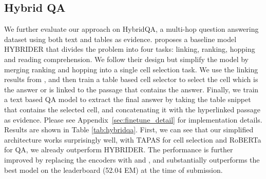 \documentclass[11pt]{article}
\newcommand{\revise}[1]{#1}
\newcommand{\nop}[1]{}
\newcommand{\ours}[0]{\text{ReasonBERT}}
\begin{document}
\subsection{Hybrid QA}
We further evaluate our approach on HybridQA, a multi-hop question answering dataset using both text and tables as evidence. \citet{chen-etal-2020-hybridqa} proposes a baseline model HYBRIDER that divides the problem into four tasks: linking, ranking, hopping and reading comprehension.\nop{ 1) linking: link questions to their corresponding cells use heuristics. 2) ranking: rank the linked cells use a neural model. 3) hopping: based on the cell selected in the last step, decide which neighboring cell or itself contains the final answer. 4) reading comprehension: extract the answer from the predicted cell or its linked paragraph.} We follow their design but simplify the model by merging ranking and hopping into a single cell selection task. We use the linking results from \citet{chen-etal-2020-hybridqa},\nop{ For each linked cell, we take a snippet out of the original table including the headers, the entire row of the linked cell, and concatenate the evidence sentence to the cell if it is linked through the hyperlinked passage.} and then train a table based cell selector to select the cell which is the answer or is linked to the passage that contains the answer. Finally, we train a text based QA model to extract the final answer by taking the table snippet that contains the selected cell, and concatenating it with the hyperlinked passage as evidence. \revise{Please see Appendix~\ref{sec:finetune_detail} for implementation details.}
Results are shown in Table \ref{tab:hybridqa}. First, we can see that our simplified architecture works surprisingly well, with TAPAS for cell selection and RoBERTa for QA, we already outperform HYBRIDER. The performance is further improved by replacing the encoders with \ours{\scriptsize{T}} and \ours{\scriptsize{R}}, and substantially outperforms the best model on the leaderboard (52.04 EM) at the time of submission.\nop{should we put this result in table 6?}
\end{document}
